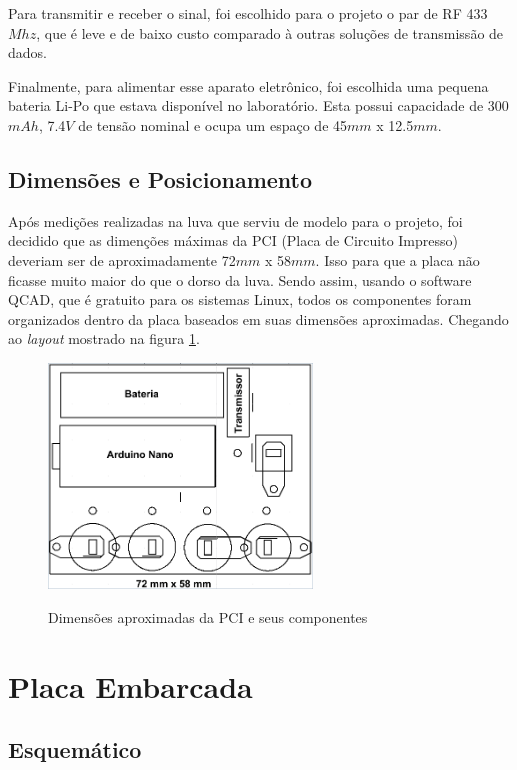 \documentclass[
	12pt,				%
	openright,			%
	oneside,			%
	a4paper,			%
	english,			%
	brazil				%
	]{abntex2}
\begin{document}
			Para transmitir e receber o sinal, foi escolhido para o projeto o par de RF 433$Mhz$, que é leve e de baixo custo comparado à outras soluções de transmissão de dados.

			Finalmente, para alimentar esse aparato eletrônico, foi escolhida uma pequena bateria Li-Po que estava disponível no laboratório. Esta possui capacidade de 300$mAh$, 7.4$V$ de tensão nominal e ocupa um espaço de 45$mm$ x 12.5$mm$.

			\subsection{Dimensões e Posicionamento}

			Após medições realizadas na luva que serviu de modelo para o projeto, foi decidido que as dimenções máximas da PCI (Placa de Circuito Impresso) deveriam ser de aproximadamente 72$mm$ x 58$mm$. Isso para que a placa não ficasse muito maior do que o dorso da luva. Sendo assim, usando o software QCAD, que é gratuito para os sistemas Linux, todos os componentes foram organizados dentro da placa baseados em suas dimensões aproximadas. Chegando ao \textit{layout} mostrado na figura \ref{Fig:size-glove-module1}.

		\begin{figure}[h!]
			\centering
			\caption{Dimensões aproximadas da PCI e seus componentes}
  		\includegraphics[width=7cm]{figures/size-glove-module1.png}
  		\label{Fig:size-glove-module1}
		\end{figure}


		\section{Placa Embarcada}
			\subsection{Esquemático}
\end{document}

